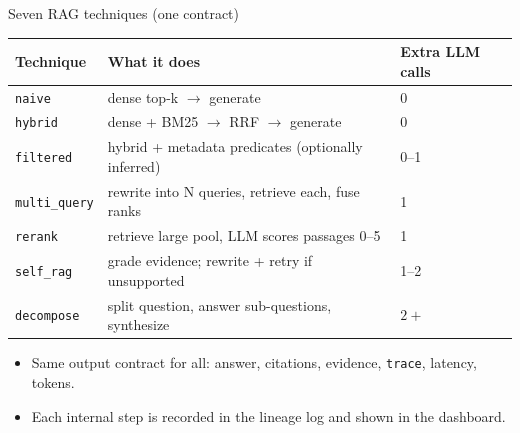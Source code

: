 \documentclass[aspectratio=169]{beamer}
\begin{document}
\begin{frame}{Seven RAG techniques (one contract)}
  \small
  \begin{table}
    \centering
    \begin{tabular}{p{}p{}p{}}
    \toprule
    Technique & What it does & Extra LLM calls \\
    \midrule
    \texttt{naive} & dense top-k $\to$ generate & 0 \\
    \texttt{hybrid} & dense + BM25 $\to$ RRF $\to$ generate & 0 \\
    \texttt{filtered} & hybrid + metadata predicates (optionally inferred) & 0--1 \\
    \texttt{multi\_query} & rewrite into N queries, retrieve each, fuse ranks & 1 \\
    \texttt{rerank} & retrieve large pool, LLM scores passages 0--5 & 1 \\
    \texttt{self\_rag} & grade evidence; rewrite + retry if unsupported & 1--2 \\
    \texttt{decompose} & split question, answer sub-questions, synthesize & $2+$ \\
    \bottomrule
    \end{tabular}
  \end{table}
  \begin{itemize}
    \item Same output contract for all: answer, citations, evidence, \texttt{trace}, latency, tokens.
    \item Each internal step is recorded in the lineage log and shown in the dashboard.
  \end{itemize}
\end{frame}
\end{document}
